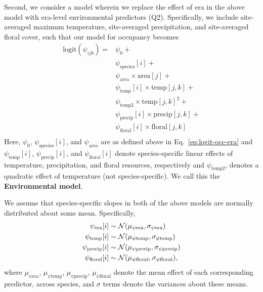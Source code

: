 \documentclass[12pt]{article}
\begin{document}
Second, we consider a model wherein we replace the effect of era in the above model with era-level environmental predictors (Q2). Specifically, we include site-averaged maximum temperature, site-averaged precipitation, and site-averaged floral cover, such that our model for occupancy becomes
\begin{equation}
\label{eq:logit-occ-full}
\begin{split}
\text{logit}(\psi_{ijk}) =& \psi_0 + \\ 
&\psi_{\mathrm{species}}[i] + \\ 
&\psi_{\mathrm{area}} \times \mathrm{area}[j] + \\
&\psi_{\mathrm{temp}}[i] \times \mathrm{temp}[j,k] + \\
&\psi_{\mathrm{temp2}} \times \mathrm{temp}[j,k]^2 + \\
&\psi_{\mathrm{precip}}[i] \times \mathrm{precip}[j,k] +\\
&\psi_{\mathrm{floral}}[i]  \times \mathrm{floral}[j,k]\\
\end{split}
\end{equation}
Here, $\psi_0$, $\psi_{\mathrm{species}}[i]$, and $\psi_{\mathrm{area}}$ are as defined above in Eq.~\ref{eq:logit-occ-era} and $\psi_{\mathrm{temp}}[i]$, $\psi_{\mathrm{precip}}[i]$, and $\psi_{\mathrm{floral}}[i]$ denote species-specific linear effects of temperature, precipitation, and floral resources, respectively and $\psi_{\mathrm{temp2}}$, denotes a quadratic effect of temperature (not species-specific). We call this the \textbf{Environmental model}.

We assume that species-specific slopes in both of the above models are normally distributed about some mean. Specifically,
\begin{equation}
\label{eq:sp-slopes}
\begin{split}
\psi_{\mathrm{era}}[i] & \sim \mathcal{N}(\mu_{\psi\mathrm{era}}, \sigma_{\psi\mathrm{era}})\\
\psi_{\mathrm{temp}}[i] & \sim \mathcal{N}(\mu_{\psi\mathrm{temp}}, \sigma_{\psi\mathrm{temp}})\\
\psi_{\mathrm{precip}}[i] & \sim \mathcal{N}(\mu_{\psi\mathrm{precip}}, \sigma_{\psi\mathrm{precip}})\\
\psi_{\mathrm{floral}}[i] & \sim \mathcal{N}(\mu_{\psi\mathrm{floral}}, \sigma_{\psi\mathrm{floral}})\hspace{0.1ex},\\
\end{split}
\end{equation}
where $\mu_{\psi\mathrm{era}}$, $\mu_{\psi\mathrm{temp}}$, $\mu_{\psi\mathrm{precip}}$, $\mu_{\psi\mathrm{floral}}$ denote the mean effect of each corresponding predictor, across species, and $\sigma$ terms denote the variances about these means.
\end{document}
